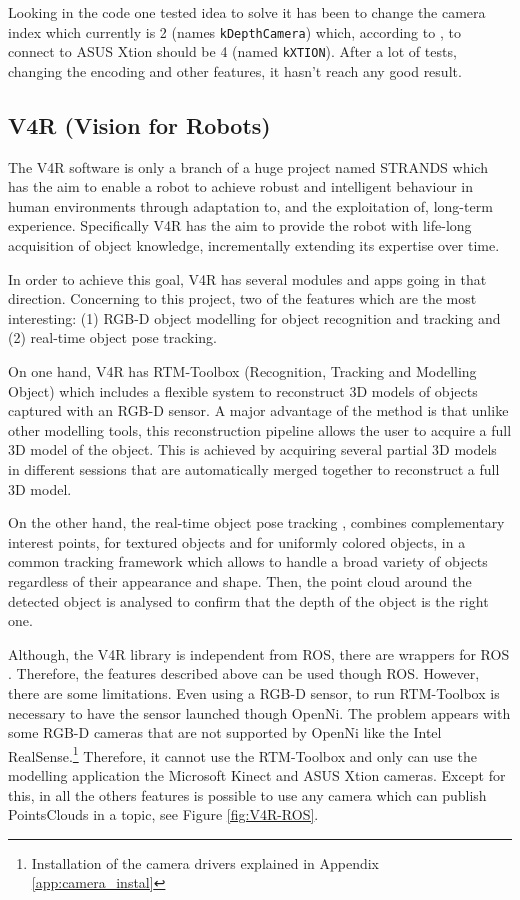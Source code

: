 \documentclass[12pt,a4paper,final,twoside,openright]{report}
\begin{document}
Looking in the code one tested idea to solve it has been to change the camera index which currently is 2 (names \texttt{kDepthCamera}) which, according to \citep{Aldebaran}, to connect to ASUS Xtion should be 4 (named \texttt{kXTION}). After a lot of tests, changing the encoding and other features, it hasn't reach any good result. 

\subsection{V4R (Vision for Robots)}
\label{sec:V4R}

The V4R software is only a branch of a huge project named STRANDS \cite{strands} which has the aim to enable a robot to achieve robust and intelligent behaviour in human environments through adaptation to, and the exploitation of, long-term experience. Specifically V4R has the aim to provide the robot with life-long acquisition of object knowledge, incrementally extending its expertise over time.

In order to achieve this goal, V4R has several modules and apps going in that direction. Concerning to this project, two of the features which are the most interesting: (1) RGB-D object modelling for object recognition and tracking and (2) real-time object pose tracking.

On one hand, V4R has RTM-Toolbox (Recognition, Tracking and Modelling Object) \cite{Prankl2015} which includes a flexible system to reconstruct 3D models of objects captured with an RGB-D sensor. A major advantage of the method is that unlike  other modelling tools, this reconstruction pipeline allows  the user to acquire a full 3D model of the object. This is  achieved by acquiring several partial 3D models in different sessions that are automatically merged together to reconstruct a full 3D model. 

On the other hand, the real-time object pose tracking \cite{Prankl2013} \cite{Aldoma2013}, combines complementary interest points, for textured objects and for uniformly colored objects, in a common tracking framework which allows to handle a broad variety of objects regardless of their appearance and shape. Then, the point cloud around the detected object is analysed to confirm that the depth of the object is the right one.

Although, the V4R library is independent from ROS, there are wrappers for ROS \cite{gitV4RWrappers}. Therefore, the features described above can be used though ROS. However, there are some limitations. Even using a RGB-D sensor, to run RTM-Toolbox is necessary to have the sensor launched though OpenNi. The problem appears with some RGB-D cameras that are not supported by OpenNi like the Intel RealSense.\footnote{Installation of the camera drivers explained in Appendix \ref{app:camera_instal}} Therefore, it cannot use the RTM-Toolbox and only can use the modelling application the Microsoft Kinect and ASUS Xtion cameras. Except for this, in all the others features is possible to use any camera which can publish PointsClouds in a topic, see Figure \ref{fig:V4R-ROS}.
\end{document}
